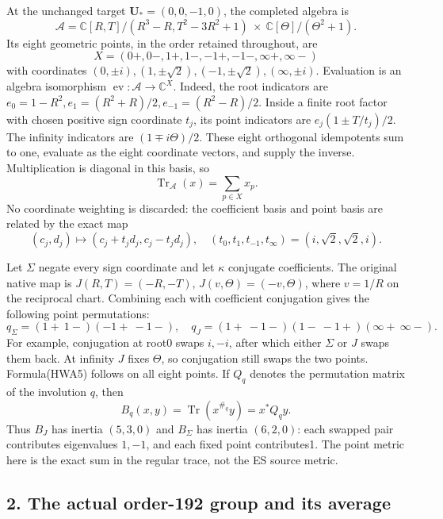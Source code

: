 \documentclass[
  10pt,
  a4paper,
]{article}
\begin{document}
At the unchanged target \(\mathbf U_*=(0,0,-1,0)\), the completed
algebra is \[
\mathcal A=\mathbb C[R,T]/(R^3-R,T^2-3R^2+1)
\ \times\ \mathbb C[\Theta]/(\Theta^2+1).
\tag{HWA1}
\] Its eight geometric points, in the order retained throughout, are \[
X=(0+,0-,1+,1-,-1+,-1-,\infty+,\infty-)
\tag{HWA2}
\] with coordinates
\((0,\pm i),(1,\pm\sqrt2),(-1,\pm\sqrt2),(\infty,\pm i)\). Evaluation is
an algebra isomorphism \(\operatorname{ev}:\mathcal A\to\mathbb C^X\).
Indeed, the root indicators are
\(e_0=1-R^2,e_1=(R^2+R)/2,e_{-1}=(R^2-R)/2\). Inside a finite root
factor with chosen positive sign coordinate \(t_j\), its point
indicators are \(e_j(1\pm T/t_j)/2\). The infinity indicators are
\((1\mp i\Theta)/2\). These eight orthogonal idempotents sum to one,
evaluate as the eight coordinate vectors, and supply the inverse.
Multiplication is diagonal in this basis, so \[
\operatorname{Tr}_{\mathcal A}(x)=\sum_{p\in X}x_p.
\tag{HWA3}
\] No coordinate weighting is discarded: the coefficient basis and point
basis are related by the exact map \[
(c_j,d_j)\longmapsto(c_j+t_jd_j,c_j-t_jd_j),
\quad(t_0,t_1,t_{-1},t_\infty)=(i,\sqrt2,\sqrt2,i).
\tag{HWA4}
\]

Let \(\Sigma\) negate every sign coordinate and let \(\kappa\) conjugate
coefficients. The original native map is \(J(R,T)=(-R,-T)\),
\(J(v,\Theta)=(-v,\Theta)\), where \(v=1/R\) on the reciprocal chart.
Combining each with coefficient conjugation gives the following point
permutations: \[
q_\Sigma=(1+\ 1-)(-1+\ -1-),
\quad
q_J=(1+\ -1-)(1-\ -1+)(\infty+\ \infty-).
\tag{HWA5}
\] For example, conjugation at root0 swaps \(i,-i\), after which either
\(\Sigma\) or \(J\) swaps them back. At infinity \(J\) fixes \(\Theta\),
so conjugation still swaps the two points. Formula(HWA5) follows on all
eight points. If \(Q_q\) denotes the permutation matrix of the
involution \(q\), then \[
B_q(x,y)=\operatorname{Tr}(x^{\#_q}y)=x^*Q_qy.
\tag{HWA6}
\] Thus \(B_J\) has inertia \((5,3,0)\) and \(B_\Sigma\) has inertia
\((6,2,0)\): each swapped pair contributes eigenvalues \(1,-1\), and
each fixed point contributes1. The point metric here is the exact sum in
the regular trace, not the ES source metric.

\subsection{2. The actual order-192 group and its
average}\label{the-actual-order-192-group-and-its-average}
\end{document}
